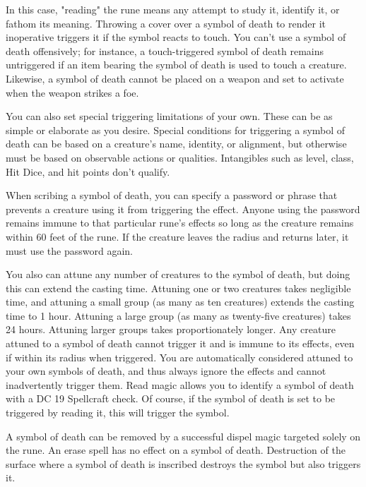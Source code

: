 \begin{multicols}{2}
\begin{small}
\smallskip\noindent In this case, "reading" the rune means any attempt to study it, identify it, or fathom its meaning. Throwing a cover over a symbol of death to render it inoperative triggers it if the symbol reacts to touch. You can't use a symbol of death offensively; for instance, a touch-triggered symbol of death remains untriggered if an item bearing the symbol of death is used to touch a creature. Likewise, a symbol of death cannot be placed on a weapon and set to activate when the weapon strikes a foe.

\smallskip\noindent You can also set special triggering limitations of your own. These can be as simple or elaborate as you desire. Special conditions for triggering a symbol of death can be based on a creature's name, identity, or alignment, but otherwise must be based on observable actions or qualities. Intangibles such as level, class, Hit Dice, and hit points don't qualify. 

\smallskip\noindent When scribing a symbol of death, you can specify a password or phrase that prevents a creature using it from triggering the effect. Anyone using the password remains immune to that particular rune's effects so long as the creature remains within 60 feet of the rune. If the creature leaves the radius and returns later, it must use the password again.

\smallskip\noindent You also can attune any number of creatures to the symbol of death, but doing this can extend the casting time. Attuning one or two creatures takes negligible time, and attuning a small group (as many as ten creatures) extends the casting time to 1 hour. Attuning a large group (as many as twenty-five creatures) takes 24 hours. Attuning larger groups takes proportionately longer. Any creature attuned to a symbol of death cannot trigger it and is immune to its effects, even if within its radius when triggered. You are automatically considered attuned to your own symbols of death, and thus always ignore the effects and cannot inadvertently trigger them.
Read magic allows you to identify a symbol of death with a DC 19 Spellcraft check. Of course, if the symbol of death is set to be triggered by reading it, this will trigger the symbol.

\smallskip\noindent A symbol of death can be removed by a successful dispel magic targeted solely on the rune. An erase spell has no effect on a symbol of death. Destruction of the surface where a symbol of death is inscribed destroys the symbol but also triggers it.


\end{small}
\end{multicols}
